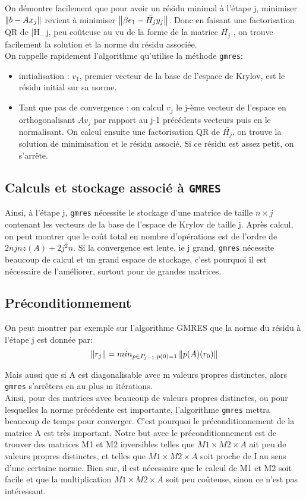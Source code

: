 On démontre facilement que pour avoir un résidu minimal à l'étape j, minimiser \(\left\lVert b-Ax_{j}\right\rVert\) revient à minimiser \(\left\lVert\beta e_1 -\bar{H_j}y_j \right\rVert\). Donc en faisant une factorisation QR de \bar{H_j}, peu coûteuse au vu de la forme de la matrice \(\bar{H_j}\) , on trouve facilement la solution et la norme du résidu associée.\\

	On rappelle rapidement l'algorithme qu'utilise la méthode \texttt{gmres}:\\
\begin{itemize}
\item{initialisation :} \(v_1\), premier vecteur de la base de l'espace de Krylov, est le résidu initial sur sa norme. 

\item{Tant que pas de convergence :} on calcul \(v_j\) le j-ème vecteur de l'espace en orthogonalisant  \(Av_j\) par rapport au j-1 précédents vecteurs puis en le normalisant. On calcul ensuite une factorisation QR de \(\bar{H_j}\), on trouve la solution de minimisation et le résidu associé. Si ce résidu est assez petit, on s'arrête. 
\end{itemize}

\subsection{Calculs et stockage associé à \texttt{GMRES}}
Ainsi, à l'étape j, \texttt{gmres} nécessite le stockage d'une matrice de taille \(n\times j\) contenant les vecteurs de la base de l'espace de Krylov de taille j. Après calcul, on peut montrer que le coût total en nombre d'opérations est de l'ordre de \(2njnz(A)+2j^2 n\). Si la convergence est lente, ie j grand, \texttt{gmres} nécessite beaucoup de calcul et un grand espace de stockage, c'est pourquoi il est nécessaire de l'améliorer, surtout pour de grandes matrices. 

\subsection{Préconditionnement}
On peut montrer par exemple sur l'algorithme GMRES que la norme du résidu à l'étape j est donnée par:
\[\left\lVert r_j\right\rVert=min_{ p \in P_{j-1},p(0)=1}\left\lVert p(A)(r_{0})\right\rVert\]

Mais aussi que si A est diagonalisable avec m valeurs propres distinctes, alors \texttt{gmres} s'arrêtera en au plus m itérations.\\
Ainsi, pour des matrices avec beaucoup de valeurs propres distinctes, ou pour lesquelles la norme précédente est importante, l’algorithme \texttt{gmres} mettra beaucoup de temps pour converger. C'est pourquoi le préconditionnement de la matrice A est très important. Notre but avec le préconditionnement est de trouver des matrices M1 et M2 inversibles telles que \(M1 \times M2 \times A\) ait peu de valeurs propres distinctes, et telles que \(M1 \times M2 \times A\) soit proche de I au sens d'une certaine norme. Bien sur, il est nécessaire que le calcul de M1 et M2 soit facile et que la multiplication \(M1 \times M2 \times A\) soit peu coûteuse, sinon ce n'est pas intéressant.
